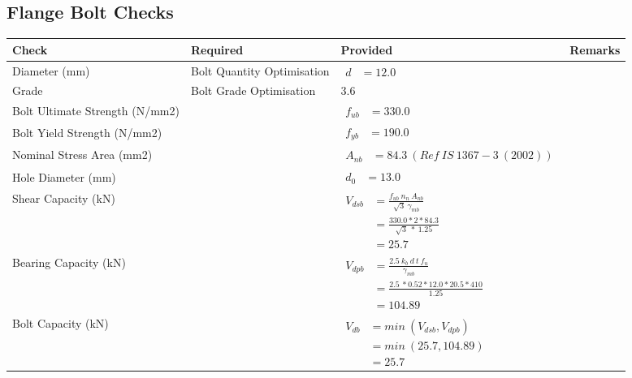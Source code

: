 \documentclass{article}%
\begin{document}
\subsection{Flange Bolt Checks}%
\label{subsec:FlangeBoltChecks}%
\renewcommand{\arraystretch}{1.2}%
\begin{longtable}{|p{3cm}|p{5.5cm}|p{6cm}|p{1.5cm}|}%
\hline%
\rowcolor{OsdagGreen}%
Check&Required&Provided&Remarks\\%
\hline%
\endhead%
\hline%
Diameter (mm)&Bolt Quantity Optimisation&$\begin{aligned} d &=12.0\end{aligned}$&\\%
\hline%
Grade&Bolt Grade Optimisation&3.6&\\%
\hline%
Bolt Ultimate Strength (N/mm2)&&$\begin{aligned} f_{ub} &=330.0\end{aligned}$&\\%
\hline%
Bolt Yield Strength (N/mm2)&&$\begin{aligned} f_{yb} &=190.0\end{aligned}$&\\%
\hline%
Nominal Stress Area (mm2)& &$\begin{aligned} A_{nb} &=84.3~( Ref~IS~1367-3~(2002))\end{aligned}$&\\%
\hline%
Hole Diameter (mm)& &$\begin{aligned} d_0 &=13.0\end{aligned}$&\\%
\hline%
Shear Capacity (kN)&&$\begin{aligned}V_{dsb} &= \frac{f_{ub} ~n_n~ A_{nb}}{\sqrt{3} ~\gamma_{mb}}\\ &= \frac{330.0*2*84.3}{\sqrt{3}~*~1.25}\\ &= 25.7\end{aligned}$&\\%
\hline%
Bearing Capacity (kN)&&$\begin{aligned}V_{dpb} &= \frac{2.5~ k_b~ d~ t~ f_u}{\gamma_{mb}}\\ &= \frac{2.5~*0.52*12.0*20.5*410}{1.25}\\ &=104.89\end{aligned}$&\\%
\hline%
Bolt Capacity (kN)&&$\begin{aligned}V_{db} &= min~ (V_{dsb}, V_{dpb})\\ &= min~ (25.7,104.89)\\ &=25.7\end{aligned}$&\\%

\end{longtable}
\end{document}
